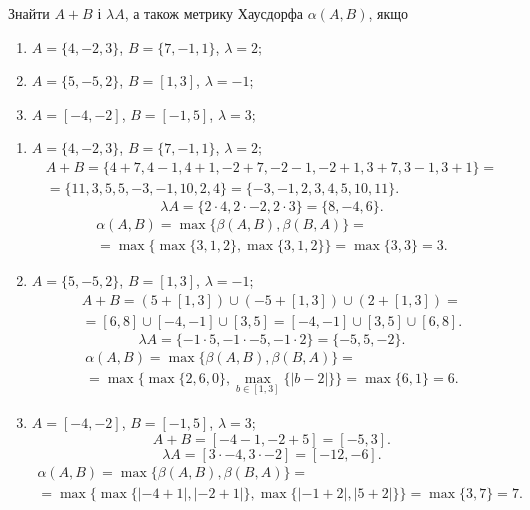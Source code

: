 
\begin{problem}
    Знайти $A + B$ і $\lambda A$, а також метрику Хаусдорфа $\alpha(A, B)$, якщо
    \begin{enumerate}
        \item $A = \{4,-2,3\}$, $B = \{7,-1,1\}$, $\lambda=2$;
        \item $A = \{5,-5,2\}$, $B = [1,3]$, $\lambda=-1$;
        \item $A = [-4,-2]$, $B = [-1,5]$, $\lambda=3$;
    \end{enumerate}
\end{problem}

\begin{solution}
    \begin{enumerate}
        \item $A = \{4,-2,3\}$, $B = \{7,-1,1\}$, $\lambda=2$;
        \begin{multline*} 
            A + B = \{4+7,4-1,4+1,-2+7,-2-1,-2+1,3+7,3-1,3+1\}= \\
            = \{11,3,5,5,-3,-1,10,2,4\} = \{-3,-1,2,3,4,5,10,11\}.
        \end{multline*} 
        \[ \lambda A = \{2 \cdot 4, 2 \cdot -2, 2 \cdot 3\} = \{8, -4, 6\}. \]
        \begin{multline*} 
            \alpha(A,B) = \max\{\beta(A,B),\beta(B,A)\} = \\
            = \max\{\max\{3,1,2\},\max\{3,1,2\}\}=\max\{3,3\}=3.
        \end{multline*} 
        \item $A = \{5,-5,2\}$, $B = [1,3]$, $\lambda=-1$;
        \begin{multline*} 
            A + B = (5 + [1,3]) \cup (-5 + [1,3]) \cup (2+[1,3])= \\
            = [6,8] \cup [-4,-1] \cup [3,5] = [-4,-1] \cup [3,5] \cup [6,8].
        \end{multline*} 
        \[ \lambda A = \{-1 \cdot 5, -1 \cdot -5, -1 \cdot 2\} = \{-5, 5, -2\}. \]
        \begin{multline*} 
            \alpha(A,B) = \max\{\beta(A,B),\beta(B,A)\} = \\
            = \max\{\max\{2,6,0\},\max_{b\in[1,3]}\{|b-2|\}\}=\max\{6,1\}=6.
        \end{multline*} 
        \item $A = [-4,-2]$, $B = [-1,5]$, $\lambda=3$;
        \[ A + B = [-4-1,-2+5] = [-5,3]. \]
        \[ \lambda A = [3 \cdot -4, 3 \cdot -2] = [-12, -6]. \]
        \begin{multline*} 
            \alpha(A,B) = \max\{\beta(A,B),\beta(B,A)\} = \\
            = \max\{\max\{|-4+1|,|-2+1|\},\max\{|-1+2|,|5+2|\}\}=\max\{3,7\}=7.
        \end{multline*}
    \end{enumerate}
\end{solution}

